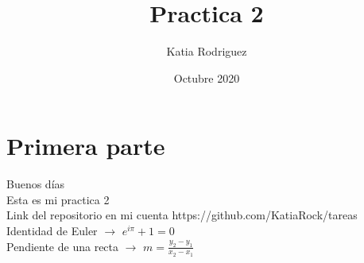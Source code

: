 \documentclass[a4paper,10pt]{article}
\title{Practica 2} %
\author{Katia Rodriguez} %
\date{Octubre 2020}
\begin{document}
\maketitle

% 

\section{Primera parte}

Buenos días \\ %

Esta es mi practica 2 \\ %

Link del repositorio en mi cuenta https://github.com/KatiaRock/tareas \\

\centering Identidad de Euler $\longrightarrow$ $ e^{i \pi} + 1 = 0 $ \\ %

Pendiente de una recta $\longrightarrow$ $m=\frac{y_2-y_1}{x_2-x_1}$ \\
\end{document}

